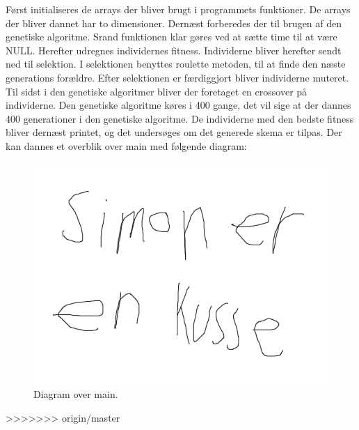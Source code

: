 Først initialiseres de arrays der bliver brugt i programmets funktioner. De arrays der bliver dannet har to dimensioner.
Dernæst forberedes der til brugen af den genetiske algoritme. Srand funktionen klar gøres ved at sætte time til at være NULL. Herefter udregnes individernes fitness. Individerne bliver herefter sendt ned til selektion. I selektionen benyttes roulette metoden, til at finde den næste generations forældre. Efter selektionen er færdiggjort bliver individerne muteret. Til sidst i den genetiske algoritmer bliver der foretaget en crossover på individerne. Den genetiske algoritme køres i 400 gange, det vil sige at der dannes 400 generationer i den genetiske algoritme.  De individerne med den bedste fitness bliver dernæst printet, og det undersøges om det generede skema er tilpas. Der kan dannes et overblik over main med følgende diagram:
\begin{figure}[!h]
  \centering
  \includegraphics[width=\textwidth]{partials/graphics/main.png}
  \caption{Diagram over main.}
  \label{fig:main}
\end{figure}
>>>>>>> origin/master
